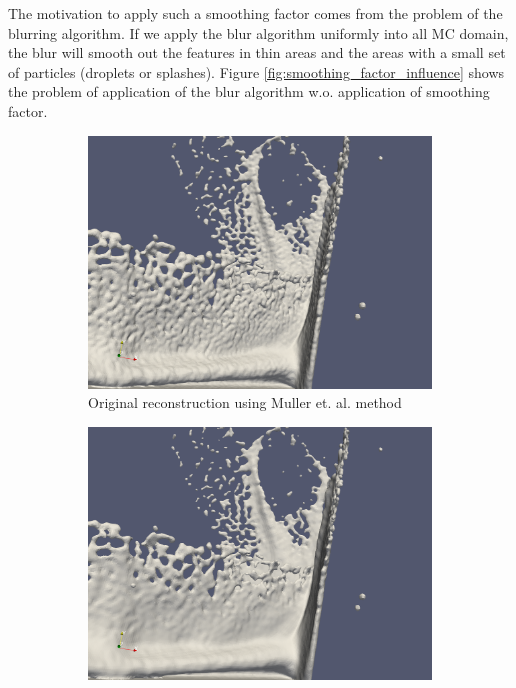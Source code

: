 The motivation to apply such a smoothing factor comes from the problem of the blurring algorithm. If we apply the blur algorithm uniformly into all MC domain, the blur will smooth out the features in thin areas and the areas with a small set of particles (droplets or splashes). Figure \ref{fig:smoothing_factor_influence} shows the problem of application of the blur algorithm w.o. application of smoothing factor.

\begin{figure}[H]
	\begin{center}
		\begin{subfigure}[b]{0.7\textwidth}
			\includegraphics[width=\textwidth]{figures/BlurSmoothingFactorOriginal.png}
			\caption{Original reconstruction using Muller et. al. method}
		\end{subfigure}
		\begin{subfigure}[b]{0.7\textwidth}
			\includegraphics[width=\textwidth]{figures/BlurSmoothingFactor0.5.png}

\end{subfigure}
\end{center}
\end{figure}
